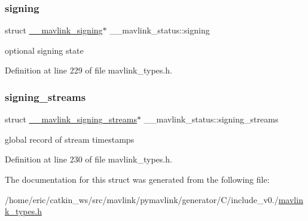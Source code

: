 \subsubsection{\texorpdfstring{signing}{signing}}
{\footnotesize\ttfamily struct \mbox{\hyperlink{struct____mavlink__signing}{\+\_\+\+\_\+mavlink\+\_\+signing}}$\ast$ \+\_\+\+\_\+mavlink\+\_\+status\+::signing}



optional signing state 



Definition at line 229 of file mavlink\+\_\+types.\+h.

\mbox{\label{struct____mavlink__status_ab0e29fe56be92a4bbd722529ac76bd84}} 
\subsubsection{\texorpdfstring{signing\_streams}{signing\_streams}}
{\footnotesize\ttfamily struct \mbox{\hyperlink{struct____mavlink__signing__streams}{\+\_\+\+\_\+mavlink\+\_\+signing\+\_\+streams}}$\ast$ \+\_\+\+\_\+mavlink\+\_\+status\+::signing\+\_\+streams}



global record of stream timestamps 



Definition at line 230 of file mavlink\+\_\+types.\+h.



The documentation for this struct was generated from the following file\+:\begin{DoxyCompactItemize}
\item 
/home/eric/catkin\+\_\+ws/src/mavlink/pymavlink/generator/\+C/include\+\_\+v0./\mbox{\hyperlink{include__v0_89_2mavlink__types_8h}{mavlink\+\_\+types.\+h}}\end{DoxyCompactItemize}
